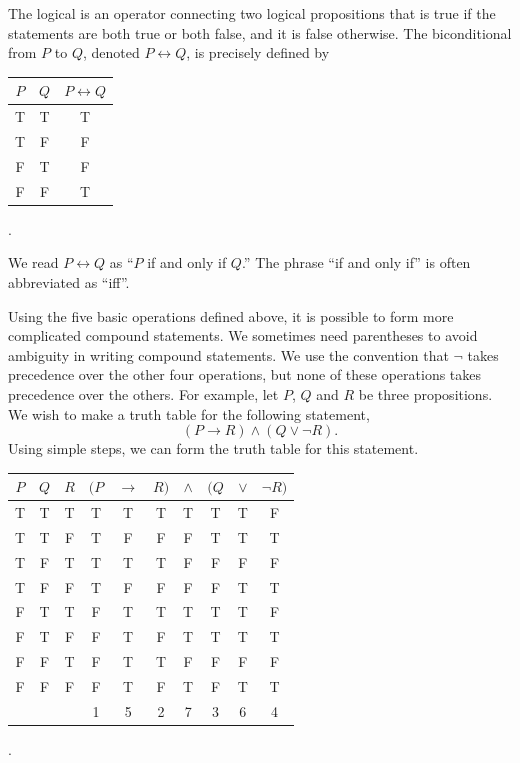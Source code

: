 The logical  is an operator connecting two logical propositions that is true if the statements are both true or both false, and it is false otherwise.
The biconditional from $P$ to $Q$, denoted $P \leftrightarrow Q$, is precisely defined by
\begin{center}
\begin{tabular}{|c|c|c|}
\hline
$P$ & $Q$ & $P \leftrightarrow Q$ \tabularnewline
\hline
T & T & T \tabularnewline
T & F & F \tabularnewline
F & T & F \tabularnewline
F & F & T \tabularnewline
\hline
\end{tabular} .
\end{center}
We read $P \leftrightarrow Q$ as ``$P$ if and only if $Q$.''
The phrase ``if and only if'' is often abbreviated as ``iff''.

Using the five basic operations defined above, it is possible to form more complicated compound statements.
We sometimes need parentheses to avoid ambiguity in writing compound statements.
We use the convention that $\neg$ takes precedence over the other four operations, but none of these operations takes precedence over the others.
For example, let $P$, $Q$ and $R$ be three propositions.
We wish to make a truth table for the following statement,
\begin{equation} \label{equation:LogicStatement}
(P \rightarrow R) \wedge (Q \vee \neg R) .
\end{equation}
Using simple steps, we can form the truth table for this statement.

\begin{center}
\begin{tabular}{|c|c|c|c:c:c:c:c:c:c|}
\hline
$P$ & $Q$ & $R$
& $(P$ & $\rightarrow$ & $R)$ & $\wedge$ & $(Q$ & $\vee$ & $\neg R)$ \tabularnewline
\hline
T & T & T & T & T & T & T & T & T & F \tabularnewline
T & T & F & T & F & F & F & T & T & T \tabularnewline
T & F & T & T & T & T & F & F & F & F \tabularnewline
T & F & F & T & F & F & F & F & T & T \tabularnewline
F & T & T & F & T & T & T & T & T & F \tabularnewline
F & T & F & F & T & F & T & T & T & T \tabularnewline
F & F & T & F & T & T & F & F & F & F \tabularnewline
F & F & F & F & T & F & T & F & T & T \tabularnewline
& & & 1 & 5 & 2 & 7 & 3 & 6 & 4 \tabularnewline
\hline
\end{tabular} .
\end{center}

